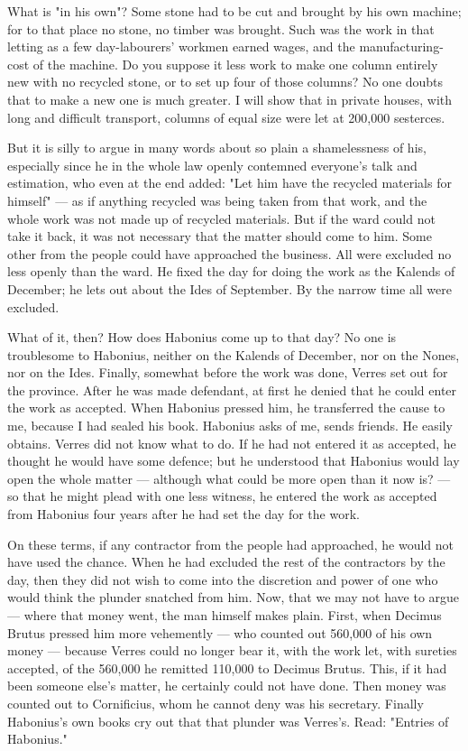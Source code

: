  What is "in his own"? Some stone had to be cut and brought by his own machine; for to that place no stone, no timber was brought. Such was the work in that letting as a few day-labourers' workmen earned wages, and the manufacturing-cost of the machine. Do you suppose it less work to make one column entirely new with no recycled stone, or to set up four of those columns? No one doubts that to make a new one is much greater. I will show that in private houses, with long and difficult transport, columns of equal size were let at 200,000 sesterces.

 But it is silly to argue in many words about so plain a shamelessness of his, especially since he in the whole law openly contemned everyone's talk and estimation, who even at the end added: "Let him have the recycled materials for himself" --- as if anything recycled was being taken from that work, and the whole work was not made up of recycled materials. But if the ward could not take it back, it was not necessary that the matter should come to him. Some other from the people could have approached the business. All were excluded no less openly than the ward. He fixed the day for doing the work as the Kalends of December; he lets out about the Ides of September. By the narrow time all were excluded.

 What of it, then? How does Habonius come up to that day? No one is troublesome to Habonius, neither on the Kalends of December, nor on the Nones, nor on the Ides. Finally, somewhat before the work was done, Verres set out for the province. After he was made defendant, at first he denied that he could enter the work as accepted. When Habonius pressed him, he transferred the cause to me, because I had sealed his book. Habonius asks of me, sends friends. He easily obtains. Verres did not know what to do. If he had not entered it as accepted, he thought he would have some defence; but he understood that Habonius would lay open the whole matter --- although what could be more open than it now is? --- so that he might plead with one less witness, he entered the work as accepted from Habonius four years after he had set the day for the work.

 On these terms, if any contractor from the people had approached, he would not have used the chance. When he had excluded the rest of the contractors by the day, then they did not wish to come into the discretion and power of one who would think the plunder snatched from him. Now, that we may not have to argue --- where that money went, the man himself makes plain. First, when Decimus Brutus pressed him more vehemently --- who counted out 560,000 of his own money --- because Verres could no longer bear it, with the work let, with sureties accepted, of the 560,000 he remitted 110,000 to Decimus Brutus. This, if it had been someone else's matter, he certainly could not have done. Then money was counted out to Cornificius, whom he cannot deny was his secretary. Finally Habonius's own books cry out that that plunder was Verres's. Read: "Entries of Habonius."

